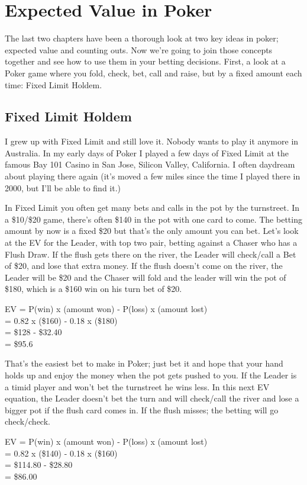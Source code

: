 \chapter{Expected Value in Poker}

The last two chapters have been a thorough look at two key ideas in
poker; expected value and counting outs. Now we're going to join
those concepts together and see how to use them in your betting
decisions. First, a look at a Poker game where you fold, check, bet,
call and raise, but by a fixed amount each time: Fixed Limit Holdem.

\section{Fixed Limit Holdem}

I grew up with Fixed Limit and still love it. Nobody wants to play it
anymore in Australia. In my early days of Poker I played a few days of
Fixed Limit at the famous Bay 101 Casino in San Jose, Silicon Valley,
California. I often daydream about playing there again (it's moved a
few miles since the time I played there in 2000, but I'll be able to
find it.)

In Fixed Limit you often get many bets and calls in the pot by the
turnstreet. In a \$10/\$20 game, there's often \$140 in the pot with
one card to come. The betting amount by now is a fixed \$20 but that's
the only amount you can bet. Let's look at the EV for the Leader,
with top two pair, betting against a Chaser who has a Flush Draw.
If the flush gets there on the river, the Leader will check/call a Bet
of \$20, and lose that extra money. If the flush doesn't come on the
river, the Leader will be \$20 and the Chaser will fold and the leader
will win the pot of \$180, which is a \$160 win on his turn bet of
\$20.

EV = P(win) x (amount won) - P(loss) x (amount lost) \\
   = 0.82   x (\$160)      - 0.18    x (\$180) \\
   = \$128 - \$32.40 \\
   = \$95.6

That's the easiest bet to make in Poker; just bet it and hope that
your hand holds up and enjoy the money when the pot gets pushed to
you. If the Leader is a timid player and won't bet the turnstreet
he wins less. In this next EV equation, the Leader doesn't bet the
turn and will check/call the river and lose a bigger pot if the flush
card comes in. If the flush misses; the betting will go check/check.

EV = P(win) x (amount won) - P(loss) x (amount lost) \\
   = 0.82   x (\$140)      - 0.18    x (\$160) \\
   = \$114.80 - \$28.80 \\
   = \$86.00

